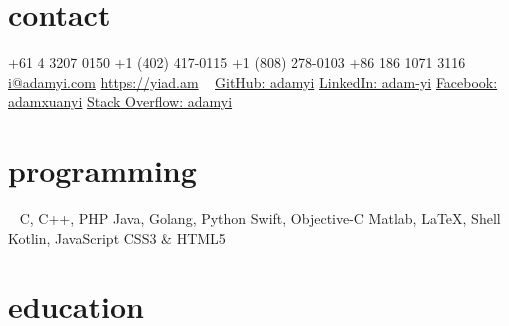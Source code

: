 \documentclass[hidelinks__VERSION__]{adamyi-cv}
\begin{document}



\begin{aside} %
\section{contact}
+61 4 3207 0150
+1 (402) 417-0115
+1 (808) 278-0103
+86 186 1071 3116
~
\href{mailto:i@adamyi.com}{i@adamyi.com}
\href{https://yiad.am}{https://yiad.am}
~
\href{https://github.com/adamyi}{GitHub: adamyi}
\href{https://www.linkedin.com/in/adam-yi/}{LinkedIn: adam-yi}
\href{https://www.facebook.com/adamxuanyi}{Facebook: adamxuanyi}
\href{https://stackoverflow.com/users/6482303/adamyi}{Stack Overflow: adamyi}
\section{programming}
~
C, C++, PHP
Java, Golang, Python
Swift, Objective-C
Matlab, \LaTeX, Shell
Kotlin, JavaScript
CSS3 \& HTML5
\versionsection
\end{aside}


\section{education}
\end{document}
